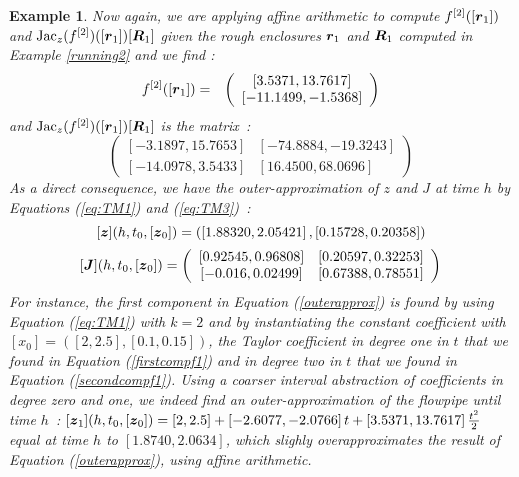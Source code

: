 \documentclass{sig-alternate-05-2015} %
\newcommand\ForAuthors[1]%
 {\par\smallskip                     %
  \begin{center}%
   \fbox%
   {\parbox{0.9\linewidth}%
    {\raggedright\sc--- #1}%
   }%
  \end{center}%
  \par\smallskip                     %
 }
\newtheorem{example}{Example}
\def\intvl#1{\mbox{$[ #1 ]$}}
\begin{document}
\begin{example}
Now again, we are applying affine arithmetic to compute 
$f^{[2]}([{\r}_{1}])$ and $\mbox{Jac}_z(f^{[2]})([{\r}_{1}]) [\bfm{R}_{1}]$
given the rough enclosures $\r_1$ and $\bfm{R}_1$ computed in Example
\ref{running2} and we find : 
\begin{eqnarray}
f^{[2]}([{\r}_{1}]) & = & \left(\begin{array}{c}
\left[    3.5371,   13.7617\right] \\
\left[  -11.1499,   -1.5368\right]
\end{array}\right)
\label{secondcompf1}
\end{eqnarray}
and $\mbox{Jac}_z(f^{[2]})([{\r}_{1}]) [\bfm{R}_{1}]$ is the matrix~: 
$$
\left(\begin{array}{cc}
\left[   -3.1897,   15.7653\right] & \left[  -74.8884,  -19.3243\right] \\
\left[  -14.0978,    3.5433\right] & \left[   16.4500,   68.0696\right]
\end{array}\right)
$$
As a direct consequence, we have the outer-approximation of $z$ and $J$ at time $h$ by Equations 
(\ref{eq:TM1}) and (\ref{eq:TM3})~: 
\begin{equation}
\intvl{\z}(h,t_0,[{\z}_0]) = \left(\left[1.88320, 2.05421\right], \left[0.15728, 0.20358\right]\right) 
\label{outerapprox}
\end{equation}
\begin{equation}
\intvl{\J}(h,t_0,[{\z}_0]) = \left(\begin{array}{cc}
\left[0.92545, 0.96808\right] & \left[0.20597, 0.32253\right] \\
\left[-0.016, 0.02499\right] & \left[0.67388, 0.78551\right]
\end{array}\right)
\label{outerapproxJ}
\end{equation}
For instance, the first component in Equation (\ref{outerapprox}) is found by using Equation (\ref{eq:TM1}) with
$k=2$ and by instantiating the constant coefficient with
$\intvl{x_0}=\left(\left[2,2.5\right], \left[0.1,0.15\right]\right)$, the Taylor coefficient in degree one in $t$ 
that we found in Equation (\ref{firstcompf1}) and in degree two in $t$ that we found in Equation 
(\ref{secondcompf1}). Using a coarser interval abstraction of coefficients in degree zero and one, we indeed
find an outer-approximation of the flowpipe until time $h$~: 
$\intvl{\z_1}(h,t_0,[{\z}_0]) = \left[2,2.5\right]+\left[-2.6077,-2.0766\right]t
+\left[    3.5371,   13.7617\right]
\frac{t^2}{2}$
\noindent equal at time $h$ to $\left[1.8740,2.0634\right]$, 
which slighly overapproximates the result of Equation (\ref{outerapprox}), using affine arithmetic. 
\end{example}
\end{document}
